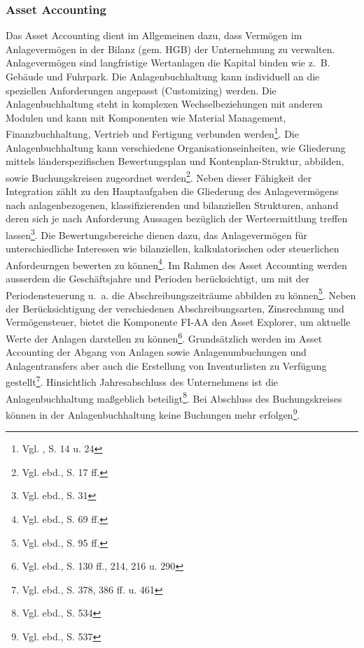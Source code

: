 \subsubsection{Asset Accounting} %
Das Asset Accounting dient im Allgemeinen dazu, dass Vermögen im Anlagevermögen in der Bilanz (gem. HGB) der Unternehmung zu verwalten. Anlagevermögen sind langfristige Wertanlagen die Kapital binden wie z.~B. Gebäude und Fuhrpark. Die Anlagenbuchhaltung kann individuell an die speziellen Anforderungen angepasst (Customizing) werden. 
Die Anlagenbuchhaltung steht in komplexen Wechselbeziehungen mit anderen Modulen und kann mit Komponenten wie Material Management, Finanzbuchhaltung, Vertrieb und Fertigung verbunden werden\footnote{Vgl. \cite{SAPFIAA2001}, S. 14 u. 24}. Die Anlagenbuchhaltung kann verschiedene Organisationseinheiten, wie Gliederung mittels länderspezifischen Bewertungsplan und Kontenplan-Struktur, abbilden, sowie Buchungskreisen zugeordnet werden\footnote{Vgl. ebd., S. 17 ff.}.
Neben dieser Fähigkeit der Integration zählt zu den Hauptaufgaben die Gliederung des Anlagevermögens nach anlagenbezogenen, klassifizierenden und bilanziellen Strukturen, anhand deren sich je nach Anforderung Aussagen bezüglich der Werteermittlung treffen lassen\footnote{Vgl. ebd., S. 31}. Die Bewertungsbereiche dienen dazu, das Anlagevermögen für unterschiedliche Interessen wie bilanziellen, kalkulatorischen oder steuerlichen Anfordeurngen bewerten zu können\footnote{Vgl. ebd., S. 69 ff.}.
Im Rahmen des Asset Accounting werden ausserdem die Geschäftsjahre und Perioden berücksichtigt, um mit der Periodensteuerung u.~a. die Abschreibungszeiträume abbilden zu können\footnote{Vgl. ebd., S. 95 ff.}. Neben der Berücksichtigung der verschiedenen Abschreibungsarten, Zinsrechnung und Vermögensteuer, bietet die Komponente FI-AA den Asset Explorer, um aktuelle Werte der Anlagen darstellen zu können\footnote{Vgl. ebd., S. 130 ff., 214, 216 u. 290}. Grundsätzlich werden im Asset Accounting der Abgang von Anlagen sowie Anlagenumbuchungen und Anlagentransfers aber auch die Erstellung von Inventurlisten zu Verfügung gestellt\footnote{Vgl. ebd., S. 378, 386 ff. u. 461}.
Hinsichtlich Jahresabschluss des Unternehmens ist die Anlagenbuchhaltung maßgeblich beteiligt\footnote{Vgl. ebd., S. 534}. Bei Abschluss des Buchungskreises können in der Anlagenbuchhaltung keine Buchungen mehr erfolgen\footnote{Vgl. ebd., S. 537}.

